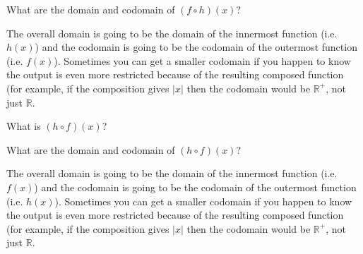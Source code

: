 \documentclass{ximera}
\begin{document}
\begin{problem}
    What are the domain and codomain of $(f\circ h)(x)$?
    \begin{multipleChoice}
    \end{multipleChoice}
    \begin{feedback}
        The overall domain is going to be the domain of the innermost function (i.e. $h(x)$) and the codomain is going to be the codomain of the outermost function (i.e. $f(x)$). Sometimes you can get a smaller codomain if you happen to know the output is even more restricted because of the resulting composed function (for example, if the composition gives $|x|$ then the codomain would be $\mathbb{R}^+$, not just $\mathbb{R}$.
    \end{feedback}
\end{problem}

\begin{problem}    
    What is $(h\circ f)(x)$? 
    \begin{multipleChoice}
    \end{multipleChoice}
\end{problem}

\begin{problem}
    What are the domain and codomain of $(h\circ f)(x)$?
    \begin{multipleChoice}
    \end{multipleChoice}
    \begin{feedback}
        The overall domain is going to be the domain of the innermost function (i.e. $f(x)$) and the codomain is going to be the codomain of the outermost function (i.e. $h(x)$). Sometimes you can get a smaller codomain if you happen to know the output is even more restricted because of the resulting composed function (for example, if the composition gives $|x|$ then the codomain would be $\mathbb{R}^+$, not just $\mathbb{R}$.
    \end{feedback}
\end{problem}
\end{document}
